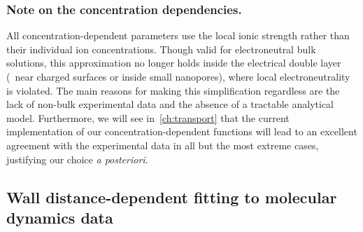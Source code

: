 \subsubsection{Note on the concentration dependencies.}
%

All concentration-dependent parameters use the local ionic strength rather than their individual ion
concentrations. Though valid for electroneutral bulk solutions, this approximation no longer holds inside the
electrical double layer (\ie~near charged surfaces or inside small nanopores), where local electroneutrality
is violated. The main reasons for making this simplification regardless are the lack of non-bulk experimental
data and the absence of a tractable analytical model. Furthermore, we will see in~\cref{ch:transport} that the
current implementation of our concentration-dependent functions will lead to an excellent agreement with the
experimental data in all but the most extreme cases, justifying our choice \textit{a posteriori}.


%
\subsection[Wall distance-dependent fitting to {MD} data]%
           {Wall distance-dependent fitting to molecular dynamics data}
%

